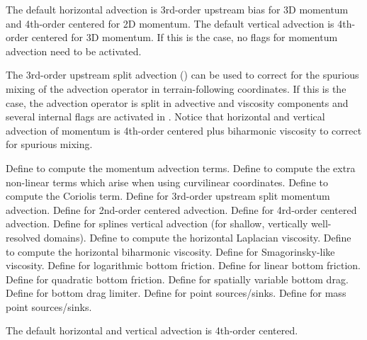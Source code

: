 \begin{klist}
    \mbox{}
The default horizontal advection is 3rd-order upstream bias for
3D momentum and 4th-order centered for 2D momentum. The default
vertical advection is 4th-order centered for 3D momentum. If this
is the case, no flags for momentum advection need to be activated.

The 3rd-order upstream split advection () can be used
to correct for the spurious mixing of the advection operator in
terrain-following coordinates. If this is the case, the advection
operator is split in advective and viscosity components and several
internal flags are activated in .  Notice that
horizontal and vertical advection of momentum is 4th-order centered
plus biharmonic viscosity to correct for spurious mixing.
  \begin{klist}
         Define to compute the momentum advection terms.
        Define to compute the extra
  non-linear terms which arise when using curvilinear coordinates.
         Define to compute the Coriolis term.
     Define for 3rd-order upstream split
  momentum advection.
     Define for 2nd-order centered advection.
     Define for 4rd-order centered advection.
     Define for splines vertical advection
    (for shallow, vertically well-resolved domains).
        Define to compute the
  horizontal Laplacian viscosity.
        Define to compute the
  horizontal biharmonic viscosity.
     Define for Smagorinsky-like viscosity.
     Define for logarithmic bottom friction.
       Define for linear bottom friction.
       Define for quadratic bottom friction.
      Define for spatially variable bottom drag.
      Define for bottom drag limiter.
     Define for point sources/sinks.
      Define for mass point sources/sinks.
  \end{klist}
   \mbox{}
The default horizontal and vertical advection is 4th-order centered.


\end{klist}
